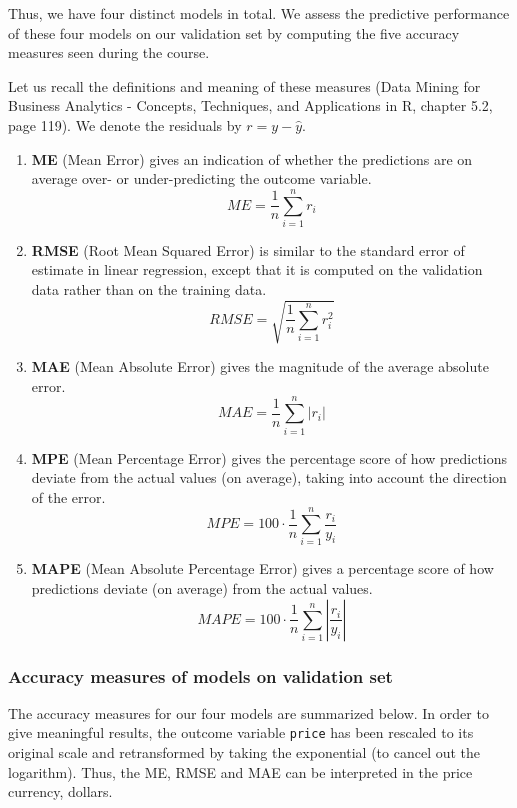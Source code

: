 \documentclass[
  paper=a4,
  ,captions=tableheading
]{scrartcl}
\providecommand{\tightlist}{%
  \setlength{\itemsep}{0pt}\setlength{\parskip}{0pt}}
\begin{document}
Thus, we have four distinct models in total. We assess the predictive
performance of these four models on our validation set by computing the
five accuracy measures seen during the course.

Let us recall the definitions and meaning of these measures (Data Mining
for Business Analytics - Concepts, Techniques, and Applications in R,
chapter 5.2, page 119). We denote the residuals by \(r = y - \hat y\).

\begin{enumerate}
\def\labelenumi{\arabic{enumi}.}
\tightlist
\item
  \textbf{ME} (Mean Error) gives an indication of whether the
  predictions are on average over- or under-predicting the outcome
  variable. \[ME = \dfrac{1}{n} \sum_{i=1}^{n}r_i\]
\item
  \textbf{RMSE} (Root Mean Squared Error) is similar to the standard
  error of estimate in linear regression, except that it is computed on
  the validation data rather than on the training data.
  \[RMSE =  \sqrt{\dfrac{1}{n}\sum_{i=1}^{n}r_i^2}\]
\item
  \textbf{MAE} (Mean Absolute Error) gives the magnitude of the average
  absolute error. \[MAE = \dfrac{1}{n} \sum_{i=1}^{n}|r_i|\]
\item
  \textbf{MPE} (Mean Percentage Error) gives the percentage score of how
  predictions deviate from the actual values (on average), taking into
  account the direction of the error.
  \[MPE = 100 \cdot \dfrac{1}{n} \sum_{i=1}^{n} \dfrac{r_i}{y_i}\]
\item
  \textbf{MAPE} (Mean Absolute Percentage Error) gives a percentage
  score of how predictions deviate (on average) from the actual values.
  \[MAPE = 100 \cdot \dfrac{1}{n} \sum_{i=1}^{n} \left| \dfrac{r_i}{y_i}\right|\]
\end{enumerate}

\hypertarget{accuracy-measures-of-models-on-validation-set}{%
\subsubsection{Accuracy measures of models on validation
set}\label{accuracy-measures-of-models-on-validation-set}}

The accuracy measures for our four models are summarized below. In order
to give meaningful results, the outcome variable \texttt{price} has been
rescaled to its original scale and retransformed by taking the
exponential (to cancel out the logarithm). Thus, the ME, RMSE and MAE
can be interpreted in the price currency, dollars.
\end{document}
